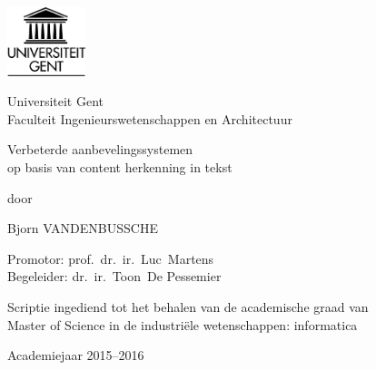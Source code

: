 

\begin{titlepage}

\setlength{\hoffset}{-1in}
\setlength{\voffset}{-1in}
\setlength{\topmargin}{1.5cm}
\setlength{\headheight}{0.5cm}
\setlength{\headsep}{1cm}
\setlength{\oddsidemargin}{3cm}
\setlength{\evensidemargin}{3cm}
\setlength{\footskip}{1.5cm}
\enlargethispage{1cm}

\fontsize{12pt}{14pt}
\selectfont

\begin{center}

\includegraphics[height=2cm]{fig/ruglogo}

\vspace{0.5cm}

Universiteit Gent\\
Faculteit Ingenieurswetenschappen en Architectuur\\

\vspace{4.5cm}

\fontsize{17.28pt}{21pt}
\selectfont

Verbeterde aanbevelingssystemen 
\\op basis van content herkenning in tekst


\fontsize{12pt}{14pt}
\selectfont

\vspace{.6cm}

door 

\vspace{.4cm}

Bjorn VANDENBUSSCHE

\vspace{3.5cm}

Promotor: prof.~dr.~ir.~Luc~Martens\\
Begeleider: dr.~ir.~Toon~De Pessemier\\

\vspace{2cm}

Scriptie ingediend tot het behalen van de academische graad van\\ 
Master of Science in de industri\"ele wetenschappen: informatica

\vspace{1cm}

Academiejaar 2015--2016

\end{center}
\end{titlepage}
